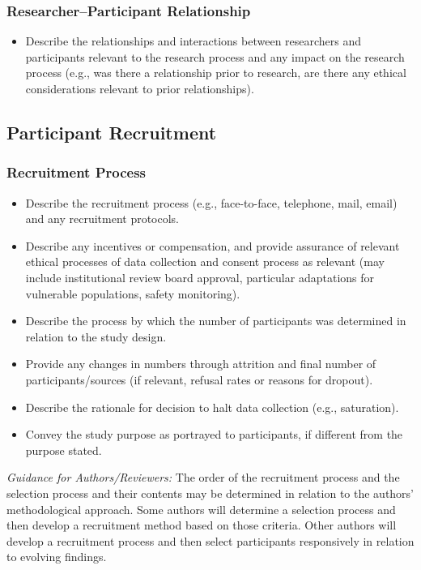 \documentclass[acmsmall,screen,anonymous,review]{acmart}
\begin{document}
\subsubsection{Researcher–Participant Relationship}
\begin{itemize}
    \item Describe the relationships and interactions between researchers and participants
relevant to the research process and any impact on the research process (e.g., was
there a relationship prior to research, are there any ethical considerations relevant
to prior relationships).

\end{itemize}

\subsection{Participant Recruitment}
\subsubsection{Recruitment Process}

\begin{itemize}
    \item Describe the recruitment process (e.g., face-to-face, telephone, mail, email) and any
recruitment protocols.
\item  Describe any incentives or compensation, and provide assurance of relevant ethical
processes of data collection and consent process as relevant (may include institutional
review board approval, particular adaptations for vulnerable populations, safety monitoring).
\item  Describe the process by which the number of participants was determined in relation to the
study design.
\item  Provide any changes in numbers through attrition and final number of participants/sources
(if relevant, refusal rates or reasons for dropout).
\item  Describe the rationale for decision to halt data collection (e.g., saturation).
\item  Convey the study purpose as portrayed to participants, if different from the purpose stated.
\end{itemize}


\textit{Guidance for Authors/Reviewers:} The order of the recruitment process and the selection process and their contents may be determined in relation to the authors’ methodological approach. Some authors will determine a selection process and then develop a recruitment method based on those criteria. Other authors will develop a recruitment process and then select participants responsively in relation to evolving findings.
\end{document}
